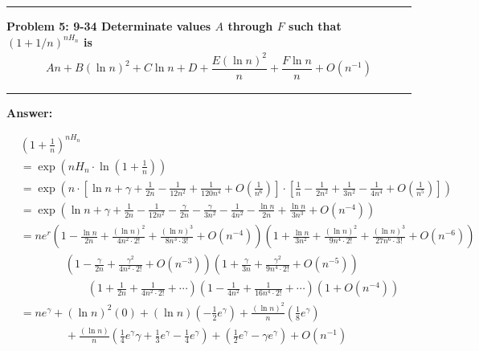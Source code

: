 \documentclass[11pt,fleqn]{article}
\newcommand\question[2]{\vspace{.25in}\hrule\textbf{#1: #2}\vspace{.5em}\hrule\vspace{.10in}}
\renewcommand\part[1]{\vspace{.10in}\textbf{#1}}
\begin{document}
\question{Problem 5} {9-34 Determinate values $A$ through $F$ such that $(1+1/n)^{n H_n}$ 
	is
	\begin{align*}
		An + B(\ln n)^2 + C \ln n + D + \dfrac{E(\ln n)^2}{n} + \dfrac{F \ln n}{n} + O(n^{-1})
	\end{align*}
}

\part{Answer:}

\begin{align*}
	& \left(1 + \frac{1}{n} \right)^{n H_n} \\
		&= \exp\left(n H_n \cdot \ln\left( 1 + \frac{1}{n} \right) \right) \\
		&= \exp\left(n \cdot 
			\left[ \ln n + \gamma + \frac{1}{2n} - \frac{1}{12n^2} + \frac{1}{120n^4} + O(\frac{1}{n^6}) \right] \cdot 
			\left[ \frac{1}{n} - \frac{1}{2n^2} + \frac{1}{3n^2} - \frac{1}{4n^4} + O(\frac{1}{n^5}) \right]
			\right) \\
		&= \exp\left( \ln n + \gamma + \frac{1}{2n} - \frac{1}{12n^2} 
				- \frac{\gamma}{2n} - \frac{\gamma}{3n^2} - \frac{1}{4n^2}
				- \frac{\ln n}{2n} + \frac{\ln n}{3n^3} + O(n^{-4})\right) \\
		&= n e^r \left(1 - \frac{\ln n}{2n} + \frac{(\ln n)^2}{4n^2\cdot 2!}
					+ \frac{(\ln n)^3}{8n^3\cdot 3!} + O(n^{-4}) \right)
			\left(1 + \frac{\ln n}{3n^2} + \frac{(\ln n)^2}{9n^4\cdot 2!}
					+ \frac{(\ln n)^3}{27n^6\cdot 3!} + O(n^{-6}) \right) \\
		&	\qquad \qquad 
			\left(1 - \frac{\gamma}{2n} + \frac{\gamma^2}{4n^2\cdot 2!} + O(n^{-3}) \right) 
			\left(1 + \frac{\gamma}{3n} + \frac{\gamma^2}{9n^4\cdot 2!} + O(n^{-5}) \right) \\
		&	\qquad \qquad \qquad 
			\left(1 + \frac{1}{2n} + \frac{1}{4n^2 \cdot 2!} + \cdots \right)
			\left(1 - \frac{1}{4n^2} + \frac{1}{16n^4 \cdot 2!} + \cdots \right) 
			\left(1 + O(n^{-4})\right)\\
		&= ne^\gamma + \left(\ln n\right)^2 (0) + 
			\left(\ln n\right) \left(-\frac{1}{2}e^\gamma\right) 
			+ \frac{\left(\ln n\right)^2}{n} \left(\frac{1}{8} e^\gamma\right) \\
		&	\qquad \qquad
			+ \frac{\left(\ln n\right)}{n} 
				\left(\frac{1}{4} e^\gamma \gamma + \frac{1}{3} e^\gamma 
				- \frac{1}{4} e^\gamma\right)
			+ \left(\frac{1}{2} e^\gamma - \gamma e^\gamma \right) + O(n^{-1})
\end{align*}
\end{document}
